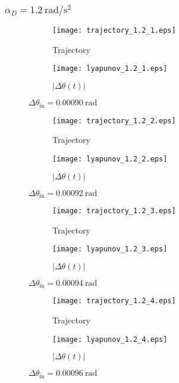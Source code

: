 \documentclass[a4paper]{article}
\begin{document}
	\subsubsection{$\alpha _D = 1.2\mathrm{~rad/s^2}$}
	\begin{figure}[H]
		\centering
		\begin{subfigure}{0.85\textwidth}
		\texttt{[image: trajectory\_1.2\_1.eps]}
		\caption{Trajectory}	
		\end{subfigure}
		\begin{subfigure}{0.85\textwidth}
		\texttt{[image: lyapunov\_1.2\_1.eps]}
		\caption{$|\Delta\theta(t)|$}	
		\end{subfigure}
		\caption{$\Delta\theta_{\mathrm{in}} = 0.00090\mathrm{~rad}$}
	\end{figure}
	\newpage
	\begin{figure}[H]
		\centering
		\begin{subfigure}{0.85\textwidth}
		\texttt{[image: trajectory\_1.2\_2.eps]}
		\caption{Trajectory}	
		\end{subfigure}
		\begin{subfigure}{0.85\textwidth}
		\texttt{[image: lyapunov\_1.2\_2.eps]}
		\caption{$|\Delta\theta(t)|$}	
		\end{subfigure}
		\caption{$\Delta\theta_{\mathrm{in}} = 0.00092\mathrm{~rad}$}
	\end{figure}
	\newpage
	\begin{figure}[H]
		\centering
		\begin{subfigure}{0.85\textwidth}
		\texttt{[image: trajectory\_1.2\_3.eps]}
		\caption{Trajectory}	
		\end{subfigure}
		\begin{subfigure}{0.85\textwidth}
		\texttt{[image: lyapunov\_1.2\_3.eps]}
		\caption{$|\Delta\theta(t)|$}	
		\end{subfigure}
		\caption{$\Delta\theta_{\mathrm{in}} = 0.00094\mathrm{~rad}$}
	\end{figure}
	\newpage
	\begin{figure}[H]
		\centering
		\begin{subfigure}{0.85\textwidth}
		\texttt{[image: trajectory\_1.2\_4.eps]}
		\caption{Trajectory}	
		\end{subfigure}
		\begin{subfigure}{0.85\textwidth}
		\texttt{[image: lyapunov\_1.2\_4.eps]}
		\caption{$|\Delta\theta(t)|$}	
		\end{subfigure}
		\caption{$\Delta\theta_{\mathrm{in}} = 0.00096\mathrm{~rad}$}
	\end{figure}
\end{document}
